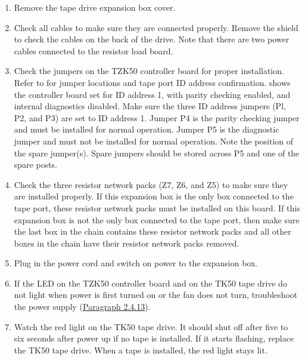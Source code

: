 \begin{enumerate}

\item	Remove the tape drive expansion box cover.

\item	Check all cables to make sure they are connected properly. Remove the
		shield to check the cables on the back of the drive. Note that there are
		two power cables connected to the resistor load board.

\item	Check the jumpers on the TZK50 controller board for proper installation. 
		Refer to  for jumper locations and tape port ID address 
		confirmation.  shows the controller board set for ID
		address 1, with parity checking enabled, and internal diagnostics disabled. 
		Make sure the three ID address jumpers (Pl, P2, and P3) are set
		to ID address 1. Jumper P4 is the parity checking jumper and must be
		installed for normal operation. Jumper P5 is the diagnostic jumper and
		must not be installed for normal operation. Note the position of the
		spare jumper(s). Spare jumpers should be stored across P5 and one of
		the spare posts.

\item	Check the three resistor network packs (Z7, Z6, and Z5) to make sure
		they are installed properly. If this expansion box is the only box 
		connected to the tape port, these resistor network packs must be installed
		on this board. If this expansion box is not the only box connected to the
		tape port, then make sure the last box in the chain contains these 
		resistor network packs and all other boxes in the chain have their resistor
		network packs removed.

\item	Plug in the power cord and switch on power to the expansion box.

\item	If the LED on the TZK50 controller board and on the TK50 tape drive
		do not light when power is first turned on or the fan does not turn,
		troubleshoot the power supply (\hyperlink{subsection.2.4.13}{Paragraph 2.4.13}).

\item	Watch the red light on the TK50 tape drive. It should shut off after five
		to six seconds after power up if no tape is installed. If it starts flashing,
		replace the TK50 tape drive. When a tape is installed, the red light stays
		lit.


\end{enumerate}
